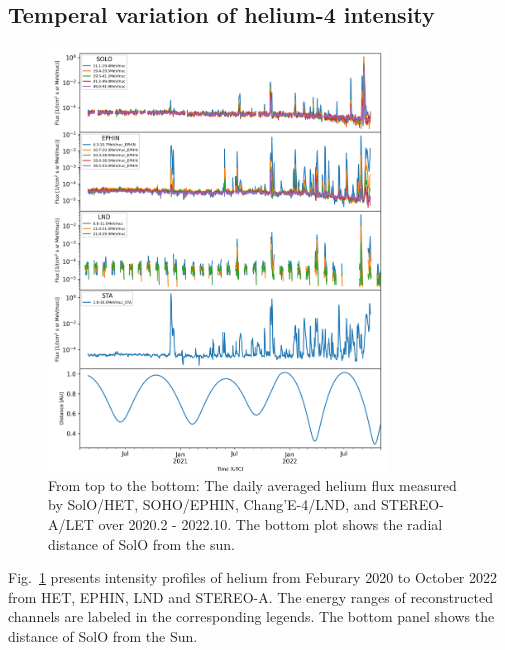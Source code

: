 \subsection*{Temperal variation of helium-4 intensity}


\begin{figure}[!htb]
    \centering
    \includegraphics[width = 0.8\textwidth]{images/ACR/overview_Helium_4_instrument.png}
    \caption[Overview of helium intensities measured by different instruments]{From top to the bottom: The daily averaged helium flux measured by \ac{SolO}/\ac{HET}, \ac{SOHO}/\ac{EPHIN}, Chang'E-4/\ac{LND}, and \ac{STEREO}-A/\ac{LET} over 2020.2 - 2022.10. The bottom plot shows the radial distance of \ac{SolO} from the sun.}
    \label{fig:overview_helium_intensity}
\end{figure}

Fig.~\ref{fig:overview_helium_intensity} presents intensity profiles of helium from Feburary 2020 to October 2022 from \ac{HET}, \ac{EPHIN}, \ac{LND} and \ac{STEREO}-A. The energy ranges of reconstructed channels are labeled in the corresponding legends. The bottom panel shows the distance of \ac{SolO} from the Sun.


